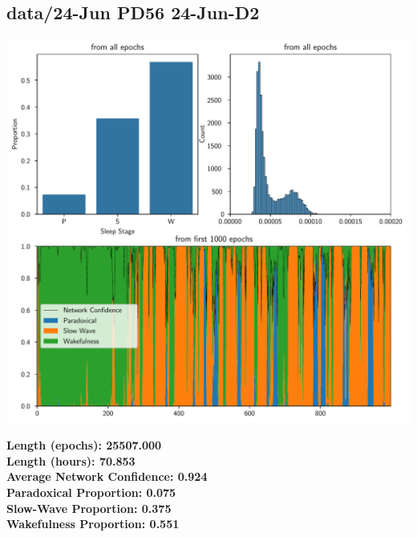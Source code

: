         \subsection*{ data/24-Jun PD56 24-Jun-D2 }
        \begin{center}
        \begin{adjustbox}{width=1\textwidth}
        \includegraphics[page=13]{figs.pdf}
        \end{adjustbox}
        \end{center}
        \large\textbf{Length (epochs): 25507.000}\\
        \textbf{Length (hours): 70.853}\\
        \textbf{Average Network Confidence: 0.924}\\
        \textbf{Paradoxical Proportion: 0.075}\\
        \textbf{Slow-Wave Proportion: 0.375}\\
        \textbf{Wakefulness Proportion: 0.551}\\
        
